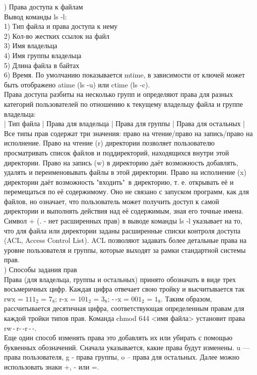 ) Права доступа к файлам \\
Вывод команды ls -l: \\
1) Тип файла и права доступа к нему \\
2) Кол-во жестких ссылок на файл \\
3) Имя владельца \\
4) Имя группы владельца \\
5) Длина файла в байтах \\
6) Время. По умолчанию показывается mtime, в зависимости от ключей может быть отображено atime (ls -u) или ctime (ls -c). \\
Права доступа разбиты на несколько групп и определяют права для разных категорий пользователей по отношению к текущему владельцу файла и группе владельца: \\
| Тип файла | Права для владельца | Права для группы | Права для остальных | \\
Все типы прав содержат три значения: право на чтение/право на запись/право на исполнение. Право на чтение (r) директории позволяет пользователю просматривать список файлов и поддиректорий, находящихся внутри этой директории. Право на запись (w) в директорию даёт возможность добавлять, удалять и переименовывать файлы в этой директории. Право на исполнение (x) директории даёт возможность "входить"\, в директорию, т. е. открывать её и перемещаться по её содержимому. Оно не связано с запуском программ, как для файлов, но означает, что пользователь может получить доступ к самой директории и выполнять действия над её содержимым, зная его точные имена. \\
Символ + (. - нет расширенных прав) в выводе команды ls -l указывает на то, что для файла или директории заданы расширенные списки контроля доступа (ACL, Access Control List). ACL позволяют задавать более детальные права на уровне пользователя и группы, которые выходят за рамки стандартной системы прав. \\

) Способы задания прав \\
Права (для владельца, группы и остальных) принято обозначать в виде трех восьмеричных цифр. Каждая цифра отвечает свою тройку и высчитывается так rwx = $111_2$ = $7_8$; r-x = $101_2$ = $3_8$; -\,-x = $001_2$ = $1_8$. Таким образом, рассчитывается десятичная цифра, соответствующая определенным правам для каждой тройки типов прав. Команда chmod 644 <имя файла> установит права rw\,-\,r-\,-r\,-\,-. \\
Еще один способ изменять права это добавлять их или убирать с помощью буквенных обозначений. Сначала указывается, какие права будут изменены. u — права пользователя, g - права группы, o – права для остальных. Далее можно использовать знаки +, - или =. \\

